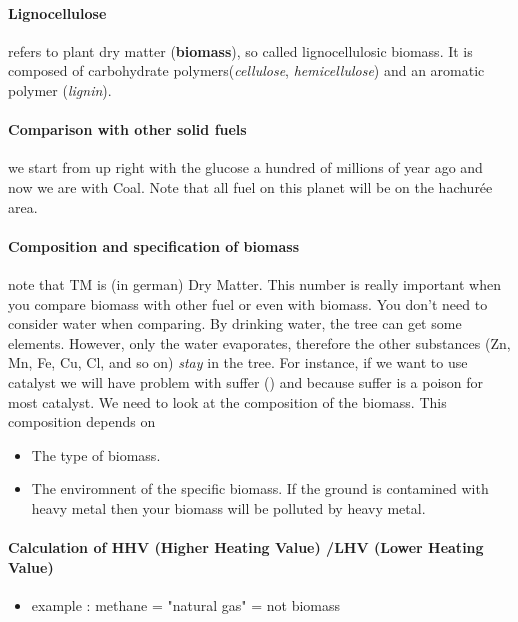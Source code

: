 \documentclass[10pt,a4paper]{article}
\begin{document}
\paragraph{Lignocellulose}refers to plant dry matter (\textbf{biomass}), so called lignocellulosic biomass. It is composed of carbohydrate polymers(\emph{cellulose}, \emph{hemicellulose}) and an aromatic polymer (\emph{lignin}).

\paragraph{Comparison with other solid fuels} we start from up right with the glucose a hundred of millions of year ago and now we are with Coal. Note that all fuel on this planet will be on the hachurée area.

\paragraph{Composition and specification of biomass} note that TM is (in german) Dry Matter. This number is really important when you compare biomass with other fuel or even with biomass. You don't need to consider water when comparing. By drinking water, the tree can get some elements. However, only the water evaporates, therefore the other substances (Zn, Mn, Fe, Cu, Cl, and so on) \emph{stay} in the tree. For instance, if we want to use catalyst we will have problem with suffer () and  because suffer is a poison for most catalyst. We need to look at the composition of the biomass. This composition depends on \begin{itemize}
\item The type of biomass.
\item The enviromnent of the specific biomass. If the ground is contamined with heavy metal then your biomass will be polluted by heavy metal.
\end{itemize}


\paragraph{Calculation of HHV (Higher Heating Value) /LHV (Lower Heating Value)}
\begin{itemize}
\item example :  methane = "natural gas" = not biomass
\end{itemize}
\end{document}
